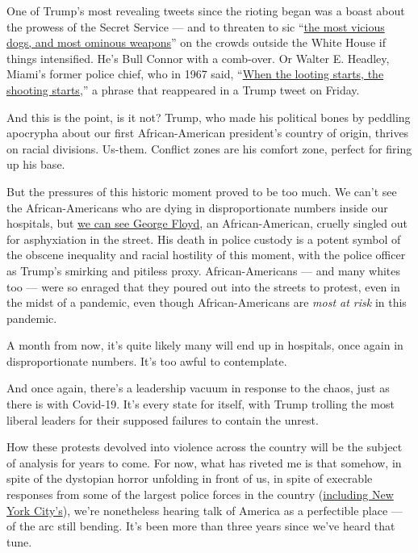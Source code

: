 One of Trump's most revealing tweets since the rioting began was a boast
about the prowess of the Secret Service --- and to threaten to sic
``\href{https://www.nytimes.com/2020/05/30/us/politics/trump-threatens-protesters-dogs-weapons.html?smtyp=cur\&smid=tw-nytimes}{the
most vicious dogs, and most ominous weapons}'' on the crowds outside the
White House if things intensified. He's Bull Connor with a comb-over. Or
Walter E. Headley, Miami's former police chief, who in 1967 said,
``\href{https://www.nytimes.com/2020/05/29/us/looting-starts-shooting-starts.html}{When
the looting starts, the shooting starts,}'' a phrase that reappeared in
a Trump tweet on Friday.

And this is the point, is it not? Trump, who made his political bones by
peddling apocrypha about our first African-American president's country
of origin, thrives on racial divisions. Us-them. Conflict zones are his
comfort zone, perfect for firing up his base.

But the pressures of this historic moment proved to be too much. We
can't see the African-Americans who are dying in disproportionate
numbers inside our hospitals, but
\href{https://www.youtube.com/watch?v=61QNgIVj9mI\&bpctr=1590953361}{we
can see George Floyd}, an African-American, cruelly singled out for
asphyxiation in the street. His death in police custody is a potent
symbol of the obscene inequality and racial hostility of this moment,
with the police officer as Trump's smirking and pitiless proxy.
African-Americans --- and many whites too --- were so enraged that they
poured out into the streets to protest, even in the midst of a pandemic,
even though African-Americans are \emph{most at risk} in this pandemic.

A month from now, it's quite likely many will end up in hospitals, once
again in disproportionate numbers. It's too awful to contemplate.

And once again, there's a leadership vacuum in response to the chaos,
just as there is with Covid-19. It's every state for itself, with Trump
trolling the most liberal leaders for their supposed failures to contain
the unrest.

How these protests devolved into violence across the country will be the
subject of analysis for years to come. For now, what has riveted me is
that somehow, in spite of the dystopian horror unfolding in front of us,
in spite of execrable responses from some of the largest police forces
in the country
(\href{https://twitter.com/samdolnick/status/1266893561481568263}{including
New York City's}), we're nonetheless hearing talk of America as a
perfectible place --- of the arc still bending. It's been more than
three years since we've heard that tune.

